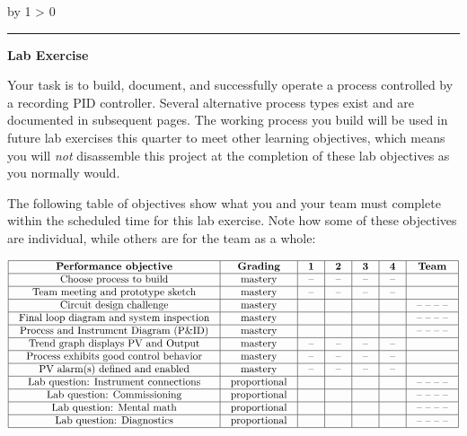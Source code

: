 \documentclass[12pt,a4paper]{article}
\def\oppgave{
            \advance\questnum by 1
            \ifnum \questnum > 0
                 \hrule
                 \vskip 3pt
                 \leftline{Oppgave \the\questnum}
                 \vskip 3pt \fi}
\begin{document}
\oppgave{} 

\noindent
{\bf Lab Exercise}

\vskip 5pt

Your task is to build, document, and successfully operate a process controlled by a recording PID controller.  Several alternative process types exist and are documented in subsequent pages.  The working process you build will be used in future lab exercises this quarter to meet other learning objectives, which means you will {\it not} disassemble this project at the completion of these lab objectives as you normally would.

The following table of objectives show what you and your team must complete within the scheduled time for this lab exercise.  Note how some of these objectives are individual, while others are for the team as a whole:



$$\vbox{\offinterlineskip
\halign{\strut
\vrule \quad\hfil # \ \hfil & 
\vrule \quad\hfil # \ \hfil & 
\vrule \quad\hfil # \ \hfil & 
\vrule \quad\hfil # \ \hfil & 
\vrule \quad\hfil # \ \hfil & 
\vrule \quad\hfil # \ \hfil & 
\vrule \quad\hfil # \ \hfil \vrule \cr
\noalign{\hrule}
%
{\bf Performance objective} & {\bf Grading} & {\bf 1} & {\bf 2} & {\bf 3} & {\bf 4} & {\bf Team} \cr
%
\noalign{\hrule}
%
Choose process to build & mastery & -- & -- & -- & -- & \cr
%
\noalign{\hrule}
%
Team meeting and prototype sketch & mastery & -- & -- & -- & -- & \cr
%
\noalign{\hrule}
%
Circuit design challenge & mastery & & & & & -- -- -- -- \cr
%
\noalign{\hrule}
%
Final loop diagram and system inspection & mastery & & & & & -- -- -- -- \cr
%
\noalign{\hrule}
%
Process and Instrument Diagram (P\&ID) & mastery & & & & & -- -- -- -- \cr
%
\noalign{\hrule}
%
Trend graph displays PV and Output & mastery & -- & -- & -- & -- &  \cr
%
\noalign{\hrule}
%
Process exhibits good control behavior & mastery & -- & -- & -- & -- &  \cr
%
\noalign{\hrule}
%
PV alarm(s) defined and enabled & mastery & -- & -- & -- & -- &  \cr
%
\noalign{\hrule}
%
Lab question: Instrument connections & proportional &  &  &  &  & -- -- -- -- \cr
%
\noalign{\hrule}
%
Lab question: Commissioning & proportional &  &  &  &  & -- -- -- -- \cr
%
\noalign{\hrule}
%
Lab question: Mental math & proportional &  &  &  &  & -- -- -- -- \cr
%
\noalign{\hrule}
%
Lab question: Diagnostics & proportional &  &  &  &  & -- -- -- -- \cr
%
\noalign{\hrule}
} %
}$$ %
\end{document}
